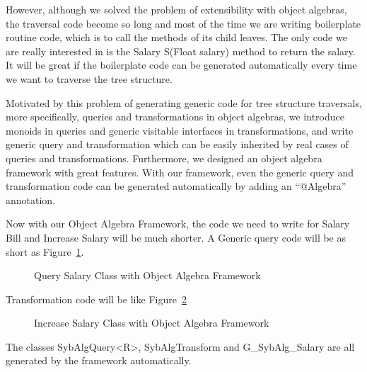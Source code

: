 However, although we solved the problem of extensibility with object algebras, the traversal code become so long and most of the time we are writing boilerplate routine code, which is to call the methods of its child leaves. The only code we are really interested in is the Salary S(Float salary) method to return the salary. It will be great if the boilerplate code can be generated automatically every time we want to traverse the tree structure. 

Motivated by this problem of generating generic code for tree structure traversals, more specifically, queries and transformations in object algebras, we introduce monoids in queries and generic visitable interfaces in transformations, and write generic query and transformation which can be easily inherited by real cases of queries and transformations. Furthermore, we designed an object algebra framework with great features. With our framework, even the generic query and transformation code can be generated automatically by adding an ``$@$Algebra'' annotation. 

Now with our Object Algebra Framework, the code we need to write for Salary Bill and Increase Salary will be much shorter. A Generic query code will be as short as Figure~\ref{query_with_oaframework}. 
\begin{figure}[tb]
\vspace{-.1in}
\caption{Query Salary Class with Object Algebra Framework}
\label{query_with_oaframework}
\end{figure}
Transformation code will be like Figure~\ref{transform_with_oaframework}
\begin{figure}[tb]
\vspace{-.1in}
\caption{Increase Salary Class with Object Algebra Framework}
\label{transform_with_oaframework}
\end{figure}
The classes SybAlgQuery<R>, SybAlgTransform and G\_SybAlg\_Salary are all generated by the framework automatically. 